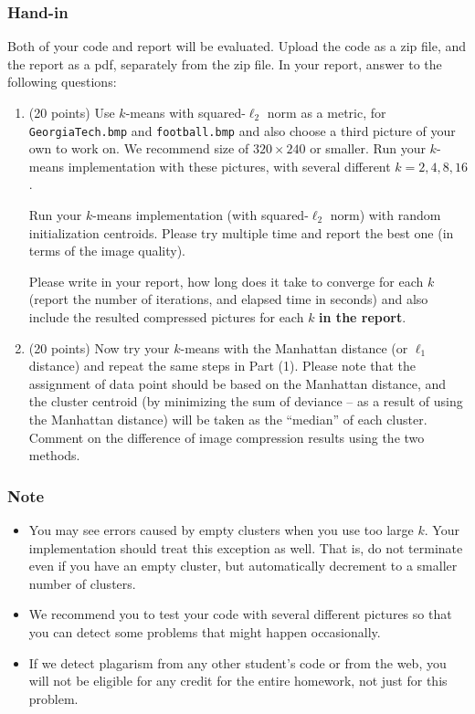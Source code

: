 \documentclass[twoside,10pt]{article}
\begin{document}
\subsubsection*{Hand-in}
Both of your code and report will be evaluated. Upload the code as a zip file, and the report as a pdf, separately from the zip file. In your report, answer to the following questions:
\begin{enumerate}
  \item (20 points) Use $k$-means with squared-$\ell_2$ norm as a metric, for \texttt{GeorgiaTech.bmp} and \texttt{football.bmp} and also choose a third picture of your own to work on. We recommend size of $320 \times 240$ or smaller. Run your $k$-means implementation with these pictures, with several different $k = 2, 4, 8, 16$. 
  
  
Run your $k$-means implementation (with squared-$\ell_2$ norm) with random initialization centroids. Please try multiple time and report the best one (in terms of the image quality).
  
Please write in your report, how long does it take to converge for each $k$ (report the number of iterations, and elapsed time in seconds) and also include the resulted compressed pictures for each $k$ \textbf{in the report}.
  
\item (20 points) Now try your $k$-means with the Manhattan distance (or $\ell_1$ distance) and repeat the same steps in Part (1). Please note that the assignment of data point should be based on the Manhattan distance, and the cluster centroid (by minimizing the sum of deviance -- as a result of using the Manhattan distance) will be taken as the ``median'' of each cluster. Comment on the difference of image compression results using the two methods.
   
\end{enumerate}


\subsubsection*{Note}
\begin{itemize}
  \item You may see errors caused by empty clusters when you use too large $k$. Your implementation should treat this exception as well. That is, do not terminate even if you have an empty cluster, but automatically decrement to a smaller number of clusters.

  \item We recommend you to test your code with several different pictures so that you can detect some problems that might happen occasionally. 

  \item If we detect plagarism from any other student's code or from the web, you will not be eligible for any credit for the entire homework, not just for this problem.
\end{itemize}
\end{document}
